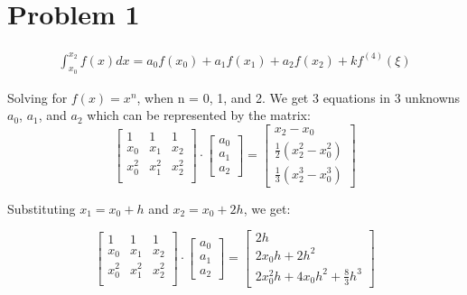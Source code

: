 \documentclass[12pt,letterpaper]{article}
\begin{document}
\section*{Problem 1}
\begin{align*}
\int_{x_0}^{x_2} f(x) dx = a_0 f(x_0) + a_1 f(x_1) + a_2 f(x_2) + k f^{(4)} (\xi)
\end{align*}

Solving for $f(x) = x^n$, when n = 0, 1, and 2. We get 3 equations in 3 unknowns $a_0$, $a_1$, and $a_2$ which can be represented by the matrix:
\begin{equation}
\begin{bmatrix}
       1 		& 		1	 		&  	1 \\
       x_{0} 	& 	x_{1} 			& 	x_{2} \\
       x_{0}^2 	& 	x_{1}^2 		& 	x_{2}^2 \\
\end{bmatrix}
     \cdot
\begin{bmatrix}
       a_{0} \\
       a_{1} \\
       a_{2}
\end{bmatrix}
     =
\begin{bmatrix}
       x_2 - x_0 \\
       \frac{1}{2}(x_2^2 - x_0^2)\\
       \frac{1}{3}(x_2^3 - x_0^3)
\end{bmatrix}
\end{equation}

Substituting $x_1 = x_0 + h$ and $x_2 = x_0 + 2h$, we get:

\begin{equation}
\begin{bmatrix}
       1 		& 		1	 		&  	1 \\
       x_{0} 	& 	x_{1} 			& 	x_{2} \\
       x_{0}^2 	& 	x_{1}^2 		& 	x_{2}^2 \\
\end{bmatrix}
     \cdot
\begin{bmatrix}
       a_{0} \\
       a_{1} \\
       a_{2}
\end{bmatrix}
     =
\begin{bmatrix}
       2h \\
       2x_0 h + 2h^2\\
       2x_0^2 h + 4x_0 h^2 + \frac{8}{3} h^3
\end{bmatrix}
\end{equation}
\end{document}
